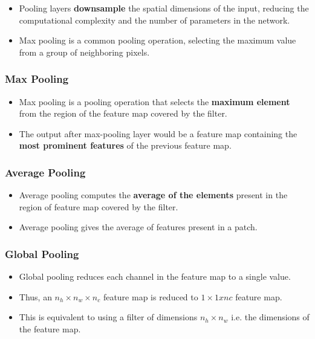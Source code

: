 \begin{itemize}
    \item Pooling layers \textbf{downsample} the spatial dimensions of the input, reducing the computational complexity and the number of parameters in the network. 
    
    \item Max pooling is a common pooling operation, selecting the maximum value from a group of neighboring pixels.

\end{itemize}

\subsubsection{Max Pooling \cite{gfg-cnn-introduction-to-pooling-layer}}\label{cnn: Max Pooling}

\begin{itemize}
    \item Max pooling is a pooling operation that selects the \textbf{maximum element} from the region of the feature map covered by the filter. 
    
    \item The output after max-pooling layer would be a feature map containing the \textbf{most prominent features} of the previous feature map.
\end{itemize}

\subsubsection{Average Pooling \cite{gfg-cnn-introduction-to-pooling-layer}}\label{cnn: Average Pooling}
\begin{itemize}
    \item Average pooling computes the \textbf{average of the elements} present in the region of feature map covered by the filter.
    
    \item Average pooling gives the average of features present in a patch.
\end{itemize}

\subsubsection{Global Pooling \cite{gfg-cnn-introduction-to-pooling-layer}}\label{cnn: Global Pooling}
\begin{itemize}
    \item Global pooling reduces each channel in the feature map to a single value.
    
    \item Thus, an $n_h \times n_w \times n_c$ feature map is reduced to $1 \times 1 x nc$ feature map. 

    \item This is equivalent to using a filter of dimensions $n_h \times n_w$ i.e. the dimensions of the feature map.
\end{itemize}

